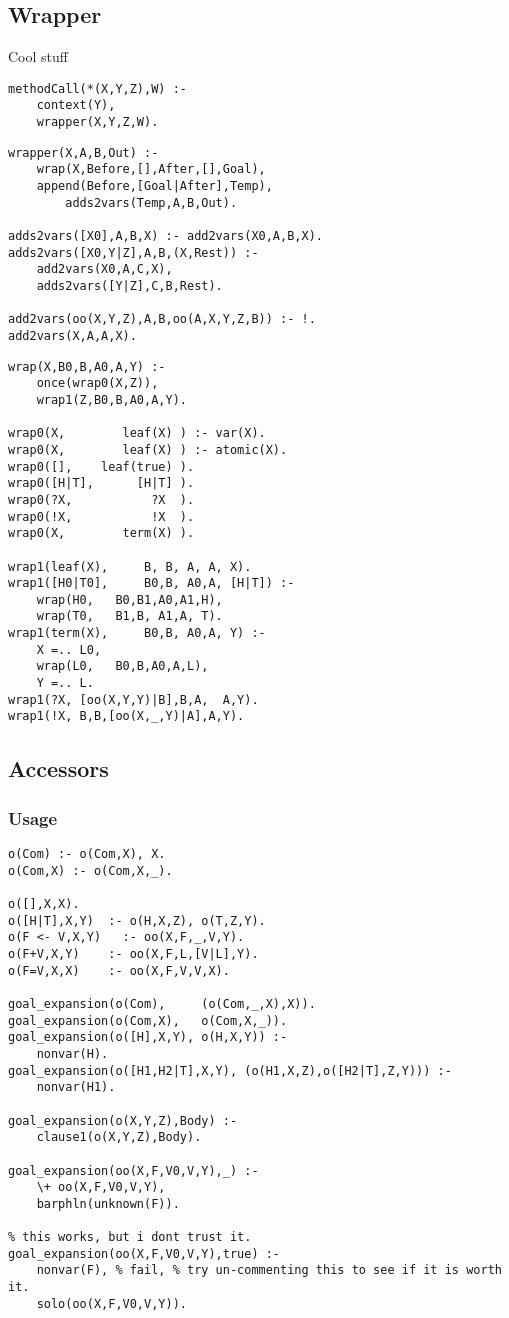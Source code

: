\documentclass[twocolumn,10pt]{book}
\begin{document}
\subsection{ Wrapper
}
 Cool stuff  \begin{Verbatim}
methodCall(*(X,Y,Z),W) :-
    context(Y),
    wrapper(X,Y,Z,W).
\end{Verbatim}
\begin{Verbatim}
wrapper(X,A,B,Out) :-
    wrap(X,Before,[],After,[],Goal),
    append(Before,[Goal|After],Temp),
        adds2vars(Temp,A,B,Out).

adds2vars([X0],A,B,X) :- add2vars(X0,A,B,X).
adds2vars([X0,Y|Z],A,B,(X,Rest)) :-
    add2vars(X0,A,C,X),
    adds2vars([Y|Z],C,B,Rest).

add2vars(oo(X,Y,Z),A,B,oo(A,X,Y,Z,B)) :- !.
add2vars(X,A,A,X).
\end{Verbatim}
\begin{Verbatim}
wrap(X,B0,B,A0,A,Y) :-
    once(wrap0(X,Z)),
    wrap1(Z,B0,B,A0,A,Y).

wrap0(X,        leaf(X) ) :- var(X).
wrap0(X,        leaf(X) ) :- atomic(X).
wrap0([],    leaf(true) ).
wrap0([H|T],      [H|T] ).
wrap0(?X,           ?X  ).
wrap0(!X,           !X  ).
wrap0(X,        term(X) ).

wrap1(leaf(X),     B, B, A, A, X).
wrap1([H0|T0],     B0,B, A0,A, [H|T]) :-
    wrap(H0,   B0,B1,A0,A1,H),
    wrap(T0,   B1,B, A1,A, T).
wrap1(term(X),     B0,B, A0,A, Y) :-
    X =.. L0,
    wrap(L0,   B0,B,A0,A,L),
    Y =.. L.
wrap1(?X, [oo(X,Y,Y)|B],B,A,  A,Y).
wrap1(!X, B,B,[oo(X,_,Y)|A],A,Y).
\end{Verbatim}
\subsection{ Accessors
}
\subsubsection{ Usage }\begin{Verbatim}
o(Com) :- o(Com,X), X.
o(Com,X) :- o(Com,X,_).

o([],X,X).
o([H|T],X,Y)  :- o(H,X,Z), o(T,Z,Y).
o(F <- V,X,Y)   :- oo(X,F,_,V,Y).
o(F+V,X,Y)    :- oo(X,F,L,[V|L],Y).
o(F=V,X,X)    :- oo(X,F,V,V,X).

goal_expansion(o(Com),     (o(Com,_,X),X)).
goal_expansion(o(Com,X),   o(Com,X,_)).
goal_expansion(o([H],X,Y), o(H,X,Y)) :-
    nonvar(H).
goal_expansion(o([H1,H2|T],X,Y), (o(H1,X,Z),o([H2|T],Z,Y))) :-
    nonvar(H1).

goal_expansion(o(X,Y,Z),Body) :-
    clause1(o(X,Y,Z),Body).

goal_expansion(oo(X,F,V0,V,Y),_) :-
    \+ oo(X,F,V0,V,Y),
    barphln(unknown(F)).

% this works, but i dont trust it.
goal_expansion(oo(X,F,V0,V,Y),true) :-
    nonvar(F), % fail, % try un-commenting this to see if it is worth it.
    solo(oo(X,F,V0,V,Y)).
\end{Verbatim}
\end{document}
